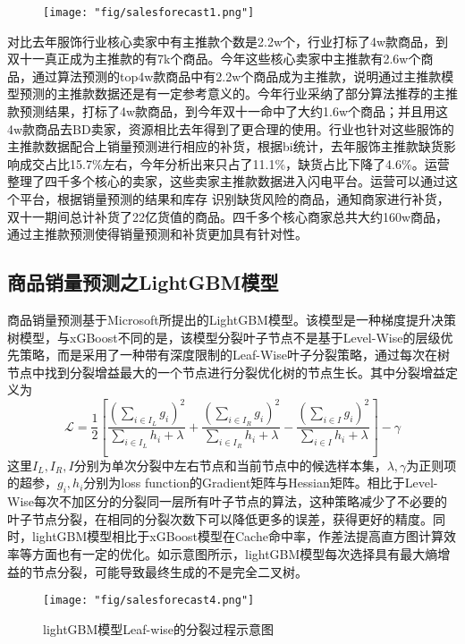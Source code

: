\begin{figure}[!h]
	\centering
	\texttt{[image: "fig/salesforecast1.png"]}
	\caption{}
	\label{fig:sf1}
\end{figure}



对比去年服饰行业核心卖家中有主推款个数是2.2w个，行业打标了4w款商品，到双十一真正成为主推款的有7k个商品。今年这些核心卖家中主推款有2.6w个商品，通过算法预测的top4w款商品中有2.2w个商品成为主推款，说明通过主推款模型预测的主推款数据还是有一定参考意义的。今年行业采纳了部分算法推荐的主推款预测结果，打标了4w款商品，到今年双十一命中了大约1.6w个商品；并且用这4w款商品去BD卖家，资源相比去年得到了更合理的使用。行业也针对这些服饰的主推款数据配合上销量预测进行相应的补货，根据bi统计，去年服饰主推款缺货影响成交占比15.7\%左右，今年分析出来只占了11.1\%，缺货占比下降了4.6\%。运营整理了四千多个核心的卖家，这些卖家主推款数据进入闪电平台。运营可以通过这个平台，根据销量预测的结果和库存 识别缺货风险的商品，通知商家进行补货，双十一期间总计补货了22亿货值的商品。四千多个核心商家总共大约160w商品，通过主推款预测使得销量预测和补货更加具有针对性。

\subsection{商品销量预测之LightGBM模型}

商品销量预测基于Microsoft所提出的LightGBM模型。该模型是一种梯度提升决策树模型，与xGBoost不同的是，该模型分裂叶子节点不是基于Level-Wise的层级优先策略，而是采用了一种带有深度限制的Leaf-Wise叶子分裂策略，通过每次在树节点中找到分裂增益最大的一个节点进行分裂优化树的节点生长。其中分裂增益定义为
$$\mathcal{L}=\frac{1}{2}\left[\frac{(\sum_{i\in I_L}{g_i})^2}{\sum_{i\in I_L}{h_i+\lambda}}+\frac{(\sum_{i\in I_R}{g_i})^2}{\sum_{i\in I_R}{h_i+\lambda}}-\frac{(\sum_{i\in I}{g_i})^2}{\sum_{i\in I}{h_i+\lambda}}\right]-\gamma $$
这里$I_L,I_R,I$分别为单次分裂中左右节点和当前节点中的候选样本集，$\lambda,\gamma$为正则项的超参，$g_i,h_i$分别为loss function的Gradient矩阵与Hessian矩阵。相比于Level-Wise每次不加区分的分裂同一层所有叶子节点的算法，这种策略减少了不必要的叶子节点分裂，在相同的分裂次数下可以降低更多的误差，获得更好的精度。同时，lightGBM模型相比于xGBoost模型在Cache命中率，作差法提高直方图计算效率等方面也有一定的优化。如示意图所示，lightGBM模型每次选择具有最大熵增益的节点分裂，可能导致最终生成的不是完全二叉树。

\begin{figure}[!h]
	\centering
	\texttt{[image: "fig/salesforecast4.png"]}
	\caption{lightGBM模型Leaf-wise的分裂过程示意图}
	\label{fig:sf4}
\end{figure}


